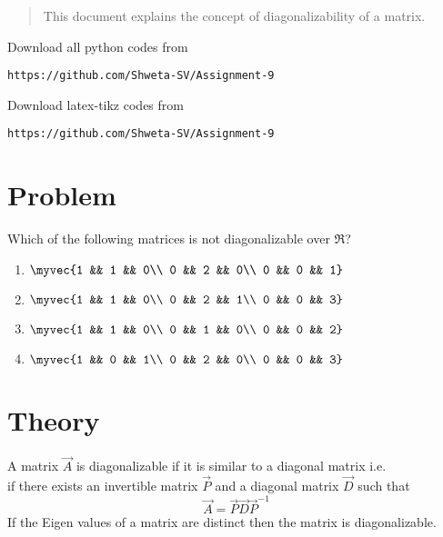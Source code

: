 \documentclass[journal,12pt,twocolumn]{IEEEtran}
\begin{document}
%
\vspace{2ex}
\begin{center}
\end{center}
\begin{abstract}
This document explains the concept of diagonalizability of a matrix.
\end{abstract}
Download all python codes from 
%
\begin{lstlisting}
https://github.com/Shweta-SV/Assignment-9
\end{lstlisting}
%
Download latex-tikz codes from 
%
\begin{lstlisting}
https://github.com/Shweta-SV/Assignment-9
\end{lstlisting}
%
\section{Problem}
Which of the following matrices is not diagonalizable over $\Re$?\\
\begin{enumerate}
\item $
\myvec{1 && 1 && 0\\ 0 && 2 && 0\\ 0 && 0 && 1}
$\\
\item $
\myvec{1 && 1 && 0\\ 0 && 2 && 1\\ 0 && 0 && 3}
$\\
\item $
\myvec{1 && 1 && 0\\ 0 && 1 && 0\\ 0 && 0 && 2}
$\\
\item $
\myvec{1 && 0 && 1\\ 0 && 2 && 0\\ 0 && 0 && 3}
$\\
\end{enumerate}
\section{Theory}
A matrix $\vec{A}$ is diagonalizable if it is similar to a diagonal matrix i.e.\\
if there exists an invertible matrix $\vec{P}$ and a diagonal matrix $\vec{D}$ such that 
\begin{equation}\label{2.0.1}
\vec{A} = \vec{P}\vec{D}\vec{P}^{-1}
\end{equation}
If the Eigen values of a matrix are distinct then the matrix is diagonalizable.
\end{document}
